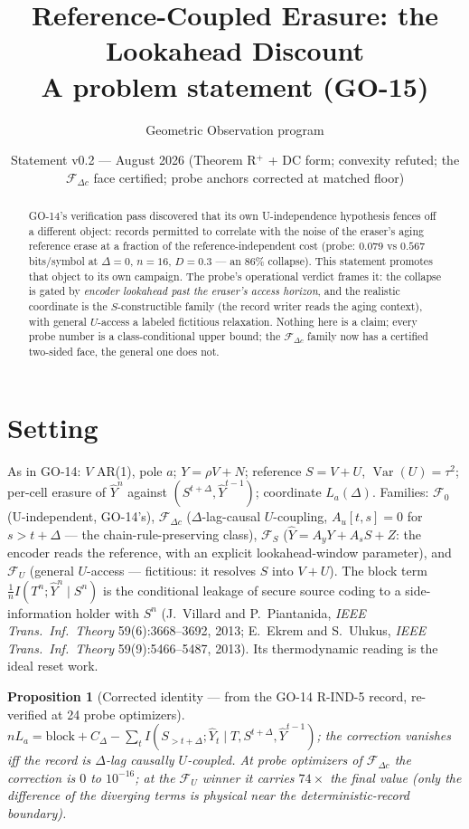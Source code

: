 \documentclass[11pt]{article}
\title{Reference-Coupled Erasure: the Lookahead Discount\\[2pt]
\large A problem statement (GO-15)}
\author{Geometric Observation program}
\date{Statement v0.2 --- August 2026 (Theorem R$^+$ + DC form; convexity refuted; the $\mathcal F_{\Delta c}$ face certified; probe anchors corrected at matched floor)}
\newtheorem{proposition}{Proposition}
\begin{document}
\maketitle

\begin{abstract}
GO-14's verification pass discovered that its own U-independence
hypothesis fences off a different object: records permitted to
correlate with the noise of the eraser's aging reference erase at a
fraction of the reference-independent cost (probe: $0.079$ vs
$0.567$ bits/symbol at $\Delta=0$, $n=16$, $D=0.3$ --- an $86\%$
collapse). This statement promotes that object to its own campaign.
The probe's operational verdict frames it: the collapse is gated by
\emph{encoder lookahead past the eraser's access horizon}, and the
realistic coordinate is the $S$-constructible family (the record
writer reads the aging context), with general $U$-access a labeled
fictitious relaxation. Nothing here is a claim; every probe number
is a class-conditional upper bound; the $\mathcal F_{\Delta c}$
family now has a certified two-sided face, the general one does not.
\end{abstract}

\section{Setting}
As in GO-14: $V$ AR(1), pole $a$; $Y=\rho V+N$; reference
$S=V+U$, $\operatorname{Var}(U)=\tau^2$; per-cell erasure of
$\hat Y^n$ against $(S^{t+\Delta},\hat Y^{t-1})$; coordinate
$L_a(\Delta)$. Families: $\mathcal F_0$ (U-independent, GO-14's),
$\mathcal F_{\Delta c}$ ($\Delta$-lag-causal $U$-coupling,
$A_u[t,s]=0$ for $s>t+\Delta$ --- the chain-rule-preserving class),
$\mathcal F_S$ ($\hat Y=A_yY+A_sS+Z$: the encoder reads the
reference, with an explicit lookahead-window parameter), and
$\mathcal F_U$ (general $U$-access --- fictitious: it resolves $S$
into $V+U$).
The block term $\tfrac1nI(T^n;\hat Y^n\mid S^n)$ is the conditional leakage of
secure source coding to a side-information holder with $S^n$ (J.~Villard and
P.~Piantanida, \emph{IEEE Trans.\ Inf.\ Theory} 59(6):3668--3692, 2013;
E.~Ekrem and S.~Ulukus, \emph{IEEE Trans.\ Inf.\ Theory} 59(9):5466--5487,
2013). Its thermodynamic reading is the ideal reset work.

\begin{proposition}[Corrected identity --- from the GO-14 R-IND-5
record, re-verified at 24 probe optimizers]
$nL_a=\mathrm{block}+C_\Delta-\sum_t
I(S_{>t+\Delta};\hat Y_t\mid T,S^{t+\Delta},\hat Y^{t-1})$; the
correction vanishes iff the record is $\Delta$-lag causally
$U$-coupled. At probe optimizers of $\mathcal F_{\Delta c}$ the
correction is $0$ to $10^{-16}$; at the $\mathcal F_U$ winner it
carries $74\times$ the final value (only the difference of the
diverging terms is physical near the deterministic-record boundary).
\end{proposition}
\end{document}
